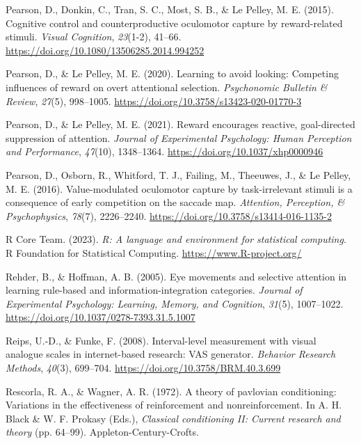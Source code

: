 \documentclass[
  man,
  floatsintext,
  longtable,
  nolmodern,
  notxfonts,
  notimes,
  mask,
  colorlinks=true,linkcolor=blue,citecolor=blue,urlcolor=blue]{apa7}
\newlength{\cslhangindent}
\newenvironment{CSLReferences}[2] %
 {\begin{list}{}{%
  \setlength{\itemindent}{0pt}
  \setlength{\leftmargin}{0pt}
  \setlength{\parsep}{0pt}
  \ifodd #1
   \setlength{\leftmargin}{\cslhangindent}
   \setlength{\itemindent}{-1\cslhangindent}
  \fi
  \setlength{\itemsep}{#2\baselineskip}}}
 {\end{list}}
\begin{document}
\begin{CSLReferences}{1}{0}
Pearson, D., Donkin, C., Tran, S. C., Most, S. B., \& Le Pelley, M. E.
(2015). Cognitive control and counterproductive oculomotor capture by
reward-related stimuli. \emph{Visual Cognition}, \emph{23}(1-2), 41--66.
\url{https://doi.org/10.1080/13506285.2014.994252}

Pearson, D., \& Le Pelley, M. E. (2020). Learning to avoid looking:
{Competing} influences of reward on overt attentional selection.
\emph{Psychonomic Bulletin \& Review}, \emph{27}(5), 998--1005.
\url{https://doi.org/10.3758/s13423-020-01770-3}

Pearson, D., \& Le Pelley, M. E. (2021). Reward encourages reactive,
goal-directed suppression of attention. \emph{Journal of Experimental
Psychology: Human Perception and Performance}, \emph{47}(10),
1348--1364. \url{https://doi.org/10.1037/xhp0000946}

Pearson, D., Osborn, R., Whitford, T. J., Failing, M., Theeuwes, J., \&
Le Pelley, M. E. (2016). Value-modulated oculomotor capture by
task-irrelevant stimuli is a consequence of early competition on the
saccade map. \emph{Attention, Perception, \& Psychophysics},
\emph{78}(7), 2226--2240.
\url{https://doi.org/10.3758/s13414-016-1135-2}

R Core Team. (2023). \emph{R: A language and environment for statistical
computing}. R Foundation for Statistical Computing.
\url{https://www.R-project.org/}

Rehder, B., \& Hoffman, A. B. (2005). Eye movements and selective
attention in learning rule-based and information-integration categories.
\emph{Journal of Experimental Psychology: Learning, Memory, and
Cognition}, \emph{31}(5), 1007--1022.
\url{https://doi.org/10.1037/0278-7393.31.5.1007}

Reips, U.-D., \& Funke, F. (2008). Interval-level measurement with
visual analogue scales in internet-based research: VAS generator.
\emph{Behavior Research Methods}, \emph{40}(3), 699--704.
\url{https://doi.org/10.3758/BRM.40.3.699}

Rescorla, R. A., \& Wagner, A. R. (1972). A theory of pavlovian
conditioning: Variations in the effectiveness of reinforcement and
nonreinforcement. In A. H. Black \& W. F. Prokasy (Eds.),
\emph{Classical conditioning II: Current research and theory} (pp.
64--99). Appleton-Century-Crofts.


\end{CSLReferences}
\end{document}
